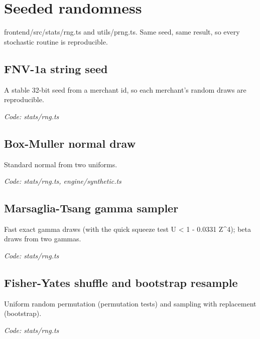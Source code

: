 \documentclass[11pt,a4paper]{article}
\newcommand{\where}[1]{\par{\small\itshape\color{mute}Code: #1}\par}
\begin{document}
\clearpage
\section{Seeded randomness}
{\color{mute}frontend/src/stats/rng.ts and utils/prng.ts. Same seed, same result, so every stochastic routine is reproducible.}

\subsection*{FNV-1a string seed}
\par\smallskip\noindent{}\par\smallskip
A stable 32-bit seed from a merchant id, so each merchant's random draws are reproducible.
\where{stats/rng.ts}

\subsection*{Box-Muller normal draw}
\par\smallskip\noindent{}\par\smallskip
Standard normal from two uniforms.
\where{stats/rng.ts, engine/synthetic.ts}

\subsection*{Marsaglia-Tsang gamma sampler}
\par\smallskip\noindent{}\par\smallskip
\par\smallskip\noindent{}\par\smallskip
Fast exact gamma draws (with the quick squeeze test U \textless{} 1 - 0.0331 Z\textasciicircum{}4); beta draws from two gammas.
\where{stats/rng.ts}

\subsection*{Fisher-Yates shuffle and bootstrap resample}
\par\smallskip\noindent{}\par\smallskip
Uniform random permutation (permutation tests) and sampling with replacement (bootstrap).
\where{stats/rng.ts}
\end{document}
